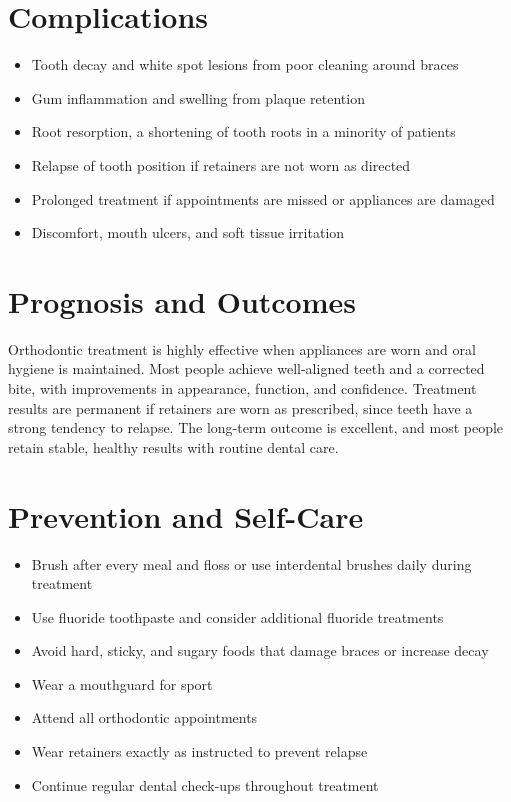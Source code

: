 \section*{Complications}
\begin{itemize}
    \item Tooth decay and white spot lesions from poor cleaning around braces
    \item Gum inflammation and swelling from plaque retention
    \item Root resorption, a shortening of tooth roots in a minority of patients
    \item Relapse of tooth position if retainers are not worn as directed
    \item Prolonged treatment if appointments are missed or appliances are damaged
    \item Discomfort, mouth ulcers, and soft tissue irritation
\end{itemize}

\section*{Prognosis and Outcomes}
Orthodontic treatment is highly effective when appliances are worn and oral hygiene is maintained. Most people achieve well-aligned teeth and a corrected bite, with improvements in appearance, function, and confidence. Treatment results are permanent if retainers are worn as prescribed, since teeth have a strong tendency to relapse. The long-term outcome is excellent, and most people retain stable, healthy results with routine dental care.

\section*{Prevention and Self-Care}
\begin{itemize}
    \item Brush after every meal and floss or use interdental brushes daily during treatment
    \item Use fluoride toothpaste and consider additional fluoride treatments
    \item Avoid hard, sticky, and sugary foods that damage braces or increase decay
    \item Wear a mouthguard for sport
    \item Attend all orthodontic appointments
    \item Wear retainers exactly as instructed to prevent relapse
    \item Continue regular dental check-ups throughout treatment
\end{itemize}

